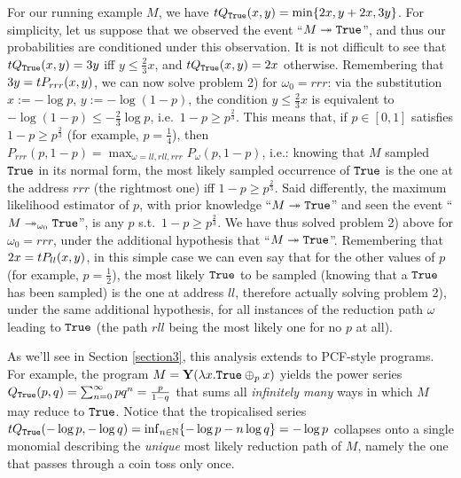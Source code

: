 \begin{example}
For our running example $M$, we have $\trop Q_{\true}(x,y)=\min\set{2x,y+2x,3y}$.
For simplicity, let us suppose that we observed the event ``$M\twoheadrightarrow\mathtt{True}$'', and thus our probabilities are conditioned under this observation.
It is not difficult to see that $\trop Q_{\true}(x,y)=3y$ iff $y\leq \frac{2}{3}x$, and $\trop Q_{\true}(x,y)=2x$ otherwise.
Remembering that $3y=\trop P_{rrr}(x,y)$, we can now solve problem 2) for $\omega_0=rrr$:
via the substitution $x:=-\log p$, $y:=-\log (1-p)$, the condition $y\leq \frac{2}{3}x$ is equivalent to $-\log (1-p)\leq -\frac{2}{3}\log p$, i.e.\ $1-p\geq p^{\frac{2}{3}}$.
This means that, if $p\in[0,1]$ satisfies $1-p\geq p^{\frac{2}{3}}$ (for example, $p=\frac{1}{4}$), then $P_{rrr}(p,1-p) = \max_{\omega=ll, rll, rrr} P_{\omega}(p,1-p)$, i.e.: knowing that $M$ sampled $\mathtt{True}$ in its normal form, the most likely sampled occurrence of $\mathtt{True}$ is the one at the address $rrr$ (the rightmost one) iff $1-p\geq p^{\frac{2}{3}}$.
Said differently, the maximum likelihood estimator of $p$, with prior knowledge  ``$M\twoheadrightarrow \mathtt{True}$'' and seen the event ``$M\twoheadrightarrow_{\omega_0}\mathtt{True}$'', is any $p$ s.t.\ $1-p\geq p^{\frac{2}{3}}$. We have thus solved problem 2) above for $\omega_0=rrr$, under the additional hypothesis that ``$M\twoheadrightarrow\mathtt{True}$''.
Remembering that $2x=\trop P_{ll}(x,y)$, in this simple case we can even say that for the other values of $p$ (for example, $p=\frac{1}{2}$), the most likely $\mathtt{True}$ to be sampled (knowing that a $\mathtt{True}$ has been sampled) is the one at address $ll$, therefore actually solving problem 2), under the same additional hypothesis, for all instances of the reduction path $\omega$ leading to $\mathtt{True}$ (the path $rll$ being the most likely one for no $p$ at all).
\end{example}

As we'll see in Section \ref{section3}, this analysis extends to PCF-style programs. For example, the program $M=\mathbf Y(\lambda x.\mathtt{True} \oplus_{p} x)$ yields the power series $Q_{\mathtt{True}}(p,q)=\sum_{n=0}^{\infty}pq^{n}=\frac{p}{1-q}$ that sums all \emph{infinitely many} ways in which $M$ may reduce to $\mathtt{True}$. Notice that the tropicalised series $\mathsf tQ_{\true}(-\log p,-\log q)=\inf_{n\in \mathbb N}\{-\log p -n\log q\}=-\log p$ collapses onto a single monomial describing the \emph{unique} most likely reduction path of $M$, namely the one that passes through a coin toss only once. 
%


